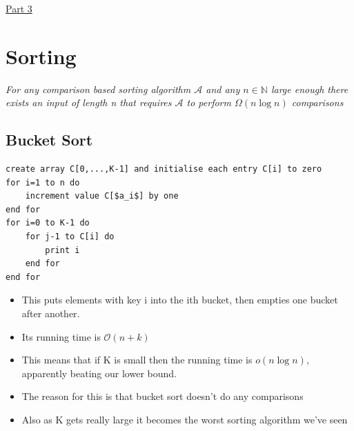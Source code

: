 \documentclass{article}[18pt]
\begin{document}
\begin{center}
\underline{\huge Part 3}
\end{center}
\section{Sorting}
\begin{center}
\textit{For any comparison based sorting algorithm $\mathcal{A}$ and any $n\in \mathbb{N}$ large enough there exists an input of length n that requires $\mathcal{A}$ to perform $\Omega(n\log n)$ comparisons}
\end{center}
\subsection{Bucket Sort}
\begin{lstlisting}[caption={BucketSort($a_1,...,a_n\in \{0,\ldots K-1\},n\geqslant 2$)}]
create array C[0,...,K-1] and initialise each entry C[i] to zero
for i=1 to n do
	increment value C[$a_i$] by one
end for
for i=0 to K-1 do
	for j-1 to C[i] do
		print i
	end for
end for
\end{lstlisting}
\begin{itemize}
	\item This puts elements with key i into the ith bucket, then empties one bucket after another.
	\item Its running time is $\mathcal{O}(n+k)$
	\item This means that if K is small then the running time is $o(n\log n)$, apparently beating our lower bound.
	\item The reason for this is that bucket sort doesn't do any comparisons
	\item Also as K gets really large it becomes the worst sorting algorithm we've seen
\end{itemize}
\end{document}
